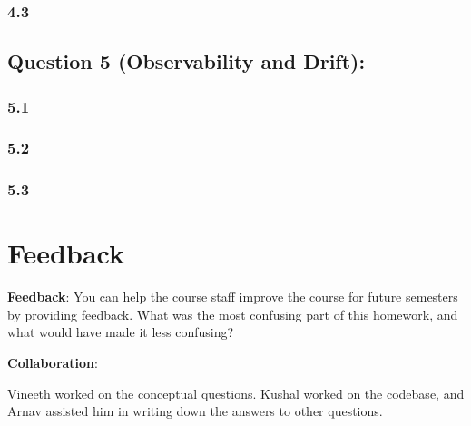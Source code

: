 \documentclass[12pt]{article}
\begin{document}
\subsubsection*{4.3}
\begin{solution}[height=6cm]
\end{solution}

\subsection*{Question 5 (Observability and Drift):}

\subsubsection*{5.1}
\begin{solution}[height=6cm]
\end{solution}

\subsubsection*{5.2}
\begin{solution}[height=6cm]
\end{solution}

\subsubsection*{5.3}
\begin{solution}[height=6cm]
\end{solution}

\newpage
\section*{Feedback}

\textbf{Feedback}: You can help the course staff improve the course for future semesters by providing feedback. What was the most confusing part of this homework, and what would have made it less confusing?
\begin{solution}[height=4cm]
\end{solution}

\textbf{Collaboration}: 
\begin{solution}[height=4cm]
    Vineeth worked on the conceptual questions. Kushal worked on the codebase, and Arnav assisted him in writing down the answers to other questions.
\end{solution}
\end{document}
